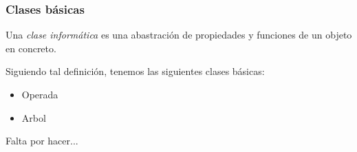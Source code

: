 \documentclass[../main.tex]{subfiles}
\begin{document}
\subsubsection*{Clases b\'asicas}
\begin{defi}
    Una \emph{clase inform\'atica} es una abastraci\'on de propiedades y funciones de un objeto en concreto.
\end{defi}

Siguiendo tal definici\'on, tenemos las siguientes clases b\'asicas:
\begin{itemize}
    \item Operada
    \item Arbol
\end{itemize}
Falta por hacer...
\end{document}
